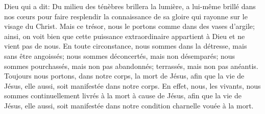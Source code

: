 Dieu qui a dit: Du milieu des ténèbres brillera la lumière,
	a lui-même brillé dans nos cœurs pour faire resplendir la connaissance de sa gloire
	qui rayonne sur le visage du Christ.
Mais ce trésor, nous le portons comme dans des vases d’argile;
	ainsi, on voit bien que cette puissance extraordinaire appartient à Dieu
	et ne vient pas de nous.
En toute circonstance, nous sommes dans la détresse, mais sans être angoissés;
	nous sommes déconcertés, mais non désemparés;
	nous sommes pourchassés, mais non pas abandonnés;
	terrassés, mais non pas anéantis.
Toujours nous portons, dans notre corps, la mort de Jésus,
	afin que la vie de Jésus, elle aussi, soit manifestée dans notre corps.
En effet, nous, les vivants,
		nous sommes continuellement livrés à la mort à cause de Jésus,
	afin que la vie de Jésus, elle aussi,
		soit manifestée dans notre condition charnelle vouée à la mort.
